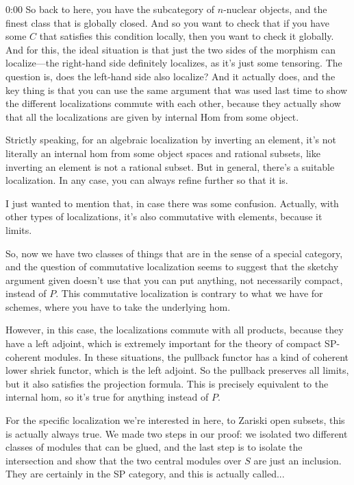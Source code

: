 \begin{unfinished}{0:00}
So back to here, you have the subcategory of $n$-nuclear objects, and the finest class that is globally closed. And so you want to check that if you have some $C$ that satisfies this condition locally, then you want to check it globally. And for this, the ideal situation is that just the two sides of the morphism can localize---the right-hand side definitely localizes, as it's just some tensoring. The question is, does the left-hand side also localize? And it actually does, and the key thing is that you can use the same argument that was used last time to show the different localizations commute with each other, because they actually show that all the localizations are given by internal Hom from some object.

Strictly speaking, for an algebraic localization by inverting an element, it's not literally an internal hom from some object spaces and rational subsets, like inverting an element is not a rational subset. But in general, there's a suitable localization. In any case, you can always refine further so that it is.

I just wanted to mention that, in case there was some confusion. Actually, with other types of localizations, it's also commutative with elements, because it limits. 

So, now we have two classes of things that are in the sense of a special category, and the question of commutative localization seems to suggest that the sketchy argument given doesn't use that you can put anything, not necessarily compact, instead of $P$. This commutative localization is contrary to what we have for schemes, where you have to take the underlying hom.

However, in this case, the localizations commute with all products, because they have a left adjoint, which is extremely important for the theory of compact SP-coherent modules. In these situations, the pullback functor has a kind of coherent lower shriek functor, which is the left adjoint. So the pullback preserves all limits, but it also satisfies the projection formula. This is precisely equivalent to the internal hom, so it's true for anything instead of $P$.

For the specific localization we're interested in here, to Zariski open subsets, this is actually always true. We made two steps in our proof: we isolated two different classes of modules that can be glued, and the last step is to isolate the intersection and show that the two central modules over $S$ are just an inclusion. They are certainly in the SP category, and this is actually called...


\end{unfinished}
